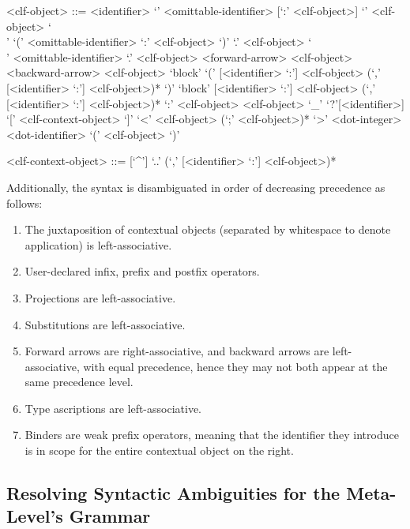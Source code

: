 \begin{grammar}
<clf-object> ::= <identifier>
\alt `{' <omittable-identifier> [`:' <clf-object>] `}' <clf-object>
\alt `\\' `(' <omittable-identifier> `:' <clf-object> `)' `.' <clf-object>
\alt `\\' <omittable-identifier> `.' <clf-object>
 <forward-arrow> <clf-object>
 <backward-arrow> <clf-object>
\alt `block' `(' [<identifier> `:'] <clf-object> (`,' [<identifier> `:'] <clf-object>)* `)'
\alt `block' [<identifier> `:'] <clf-object> (`,' [<identifier> `:'] <clf-object>)*
 `:' <clf-object>
 <clf-object>
\alt `_'
\alt `?'[<identifier>]
 `[' <clf-context-object> `]'
\alt `<' <clf-object> (`;' <clf-object>)* `>'
 <dot-integer>
 <dot-identifier>
\alt `(' <clf-object> `)'

<clf-context-object> ::= [`^']
\alt `..'
 (`,' [<identifier> `:'] <clf-object>)*
\end{grammar}

Additionally, the syntax is disambiguated in order of decreasing precedence as follows:

\begin{enumerate}
\item The juxtaposition of contextual \LF objects (separated by whitespace to denote application) is left-associative.
\item User-declared infix, prefix and postfix operators.
\item Projections are left-associative.
\item Substitutions are left-associative.
\item Forward arrows are right-associative, and backward arrows are left-associative, with equal precedence, hence they may not both appear at the same precedence level.
\item Type ascriptions are left-associative.
\item Binders are weak prefix operators, meaning that the identifier they introduce is in scope for the entire contextual \LF object on the right.
\end{enumerate}

\subsection{Resolving Syntactic Ambiguities for the Meta-Level's Grammar}

